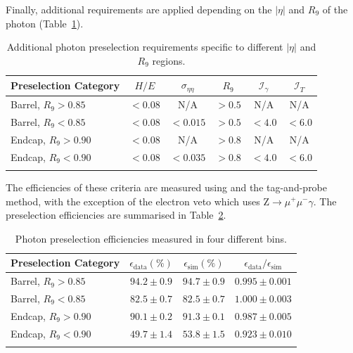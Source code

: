 Finally, additional requirements are applied depending on the $|\eta|$ and $R_9$ of the photon (Table~\ref{tab:object_reco:presel_cuts}).
\begin{table}[h!]
    \centering
    \renewcommand{\arraystretch}{1.3}
    \begin{tabular}{ l | c c c c c}
        \thickhline
        Preselection Category & $H/E$ & $\sigma_{\eta\eta}$ & $R_9$ & $\mathcal{I}_{\gamma}$ & $\mathcal{I}_T$ \\
        \hline
        Barrel, $R_{9}>0.85$ & $<0.08$  & N/A      & $>0.5$  & N/A    & N/A    \\ 
        Barrel, $R_{9}<0.85$ & $<0.08$  & $<0.015$ & $>0.5$  & $<4.0$ & $<6.0$ \\
        \hline
        Endcap, $R_{9}>0.90$ & $<0.08$  & N/A      & $>0.8$  & N/A    & N/A    \\
        Endcap, $R_{9}<0.90$ & $<0.08$  & $<0.035$ & $>0.8$  & $<4.0$ & $<6.0$ \\
        \thickhline
\end{tabular}
    \caption{Additional photon preselection requirements specific to different $|\eta|$ and $R_9$ regions.}
    \label{tab:object_reco:presel_cuts}
\end{table}



The efficiencies of these criteria are measured using \Zee and the tag-and-probe method, 
with the exception of the electron veto which uses $\mathrm{Z}\rightarrow{}\mu^{+}\mu^{-}\gamma$. The preselection efficiencies are summarised in Table~\ref{tab:object_reco:presel_eff}.
\begin{table}[h!]
    \centering
    \renewcommand{\arraystretch}{1.3}
    \begin{tabular}{ l | c c c }
        \thickhline
        Preselection Category& $\epsilon_{\mathrm{data}} (\%)$ & $\epsilon_{\mathrm{sim}} (\%)$ & $\epsilon_{\mathrm{data}}/\epsilon_{\mathrm{sim}}$ \\
        \hline
        Barrel, $R_{9}>0.85$ & $94.2\pm0.9$ & $94.7\pm0.9$ & $0.995\pm0.001$ \\
        Barrel, $R_{9}<0.85$ & $82.5\pm0.7$ & $82.5\pm0.7$ & $1.000\pm0.003$ \\ 
        \hline
        Endcap, $R_{9}>0.90$ & $90.1\pm0.2$ & $91.3\pm0.1$ & $0.987\pm0.005$ \\ 
        Endcap, $R_{9}<0.90$ & $49.7\pm1.4$ & $53.8\pm1.5$ & $0.923\pm0.010$ \\ 
        \thickhline
\end{tabular}
    \caption{Photon preselection efficiencies measured in four different bins.}
    \label{tab:object_reco:presel_eff}
\end{table}





